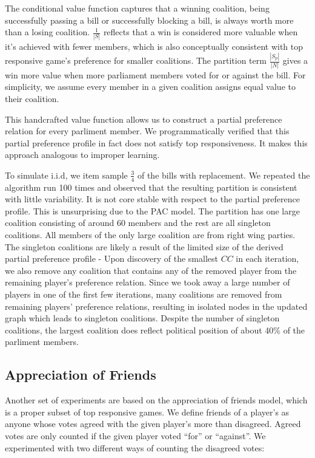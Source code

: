 \documentclass[letterpaper]{article} %
\begin{document}
The conditional value function captures that a winning coalition, being successfully passing a bill or successfully blocking a bill, is always worth more than a losing coalition. $\frac{1}{|S|}$ reflects that a win is considered more valuable when it's achieved with fewer members, which is also conceptually consistent with top responsive game's preference for smaller coalitions. The partition term $\frac{|S_p|}{|N|}$ gives a win more value when more parliament members voted for or against the bill. For simplicity, we assume every member in a given coalition assigns equal value to their coalition.

This handcrafted value function allows us to construct a partial preference relation for every parliment member. We programmatically verified that this partial preference profile in fact does not satisfy top responsiveness. It makes this approach analogous to improper learning.

To simulate i.i.d, we item sample $\frac{3}{4}$ of the bills with replacement. We repeated the algorithm run 100 times and observed that the resulting partition is consistent with little variability. It is not core stable with respect to the partial preference profile. This is unsurprising due to the PAC model. The partition has one large coalition consisting of around 60 members and the rest are all singleton coalitions. All members of the only large coalition are from right wing parties. The singleton coalitions are likely a result of the limited size of the derived partial preference profile - Upon discovery of the smallest $CC$ in each iteration, we also remove any coalition that contains any of the removed player from the remaining player's preference relation. Since we took away a large number of players in one of the first few iterations, many coalitions are removed from remaining players' preference relations, resulting in isolated nodes in the updated graph which leads to singleton coalitions. Despite the number of singleton coalitions, the largest coalition does reflect political position of about 40\% of the parliment members.

\subsection{Appreciation of Friends}
Another set of experiments are based on the appreciation of friends model, which is a proper subset of top responsive games. We define friends of a player's as anyone whose votes agreed with the given player's more than disagreed. Agreed votes are only counted if the given player voted ``for'' or ``against''. We experimented with two different ways of counting the disagreed votes:
\end{document}
